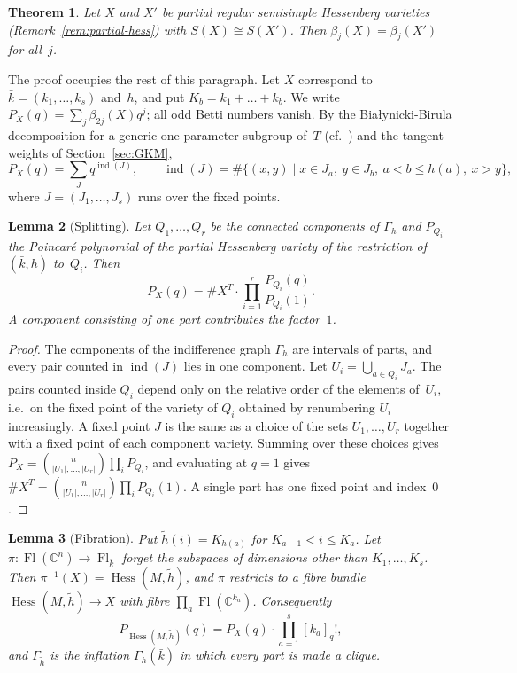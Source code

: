\documentclass[11pt,a4paper]{article}
\numberwithin{equation}{section}
\theoremstyle{plain}
\newtheorem{theorem}{Theorem}[section]
\newtheorem{lemma}[theorem]{Lemma}
\theoremstyle{definition}
\theoremstyle{remark}
\newcommand{\C}{\mathbb{C}}
\DeclareMathOperator{\Fl}{Fl}
\DeclareMathOperator{\Hess}{Hess}
\begin{document}
\begin{theorem}\label{thm:q1-partial}
Let $X$ and $X'$ be partial regular semisimple Hessenberg varieties (Remark~\ref{rem:partial-hess}) with $S(X)\cong S(X')$. Then $\beta_j(X)=\beta_j(X')$ for all~$j$.
\end{theorem}

The proof occupies the rest of this paragraph. Let $X$ correspond to $\bar k=(k_1,\dots,k_s)$ and~$h$, and put $K_b=k_1+\dots+k_b$. We write $P_X(q)=\sum_j\beta_{2j}(X)q^j$; all odd Betti numbers vanish. By the Białynicki-Birula decomposition for a generic one-parameter subgroup of~$T$ (cf.~\cite{DPS92}) and the tangent weights of Section~\ref{sec:GKM},
\[
P_X(q)=\sum_Jq^{\operatorname{ind}(J)},\qquad \operatorname{ind}(J)=\#\{(x,y)\mid x\in J_a,\ y\in J_b,\ a<b\leqslant h(a),\ x>y\},
\]
where $J=(J_1,\dots,J_s)$ runs over the fixed points.

\begin{lemma}[Splitting]\label{lem:split}
Let $Q_1,\dots,Q_r$ be the connected components of $\Gamma_h$ and $P_{Q_i}$ the Poincaré polynomial of the partial Hessenberg variety of the restriction of $(\bar k,h)$ to~$Q_i$. Then
\[
P_X(q)=\#X^T\cdot\prod_{i=1}^r\frac{P_{Q_i}(q)}{P_{Q_i}(1)}.
\]
A component consisting of one part contributes the factor~$1$.
\end{lemma}

\begin{proof}
The components of the indifference graph $\Gamma_h$ are intervals of parts, and every pair counted in $\operatorname{ind}(J)$ lies in one component. Let $U_i=\bigcup_{a\in Q_i}J_a$. The pairs counted inside $Q_i$ depend only on the relative order of the elements of~$U_i$, i.e.\ on the fixed point of the variety of $Q_i$ obtained by renumbering $U_i$ increasingly. A fixed point $J$ is the same as a choice of the sets $U_1,\dots,U_r$ together with a fixed point of each component variety. Summing over these choices gives $P_X=\binom{n}{|U_1|,\dots,|U_r|}\prod_iP_{Q_i}$, and evaluating at $q=1$ gives $\#X^T=\binom{n}{|U_1|,\dots,|U_r|}\prod_iP_{Q_i}(1)$. A single part has one fixed point and index~$0$.
\end{proof}

\begin{lemma}[Fibration]\label{lem:fibration}
Put $\tilde h(i)=K_{h(a)}$ for $K_{a-1}<i\leqslant K_a$. Let $\pi\colon\Fl(\C^n)\to\Fl_{\bar k}$ forget the subspaces of dimensions other than $K_1,\dots,K_s$. Then $\pi^{-1}(X)=\Hess(M,\tilde h)$, and $\pi$ restricts to a fibre bundle $\Hess(M,\tilde h)\to X$ with fibre $\prod_a\Fl(\C^{k_a})$. Consequently
\[
P_{\Hess(M,\tilde h)}(q)=P_X(q)\cdot\prod_{a=1}^s[k_a]_q!,
\]
and $\Gamma_{\tilde h}$ is the inflation $\Gamma_h(\bar k)$ in which every part is made a clique.
\end{lemma}
\end{document}
